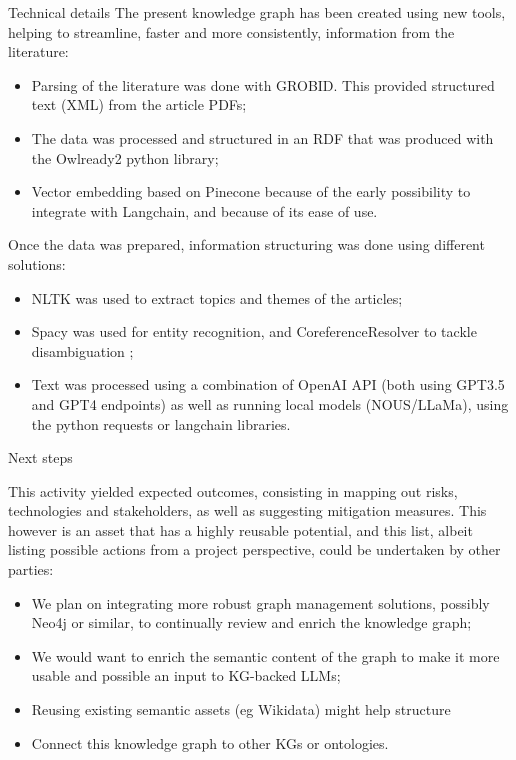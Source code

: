 \documentclass[final]{beamer}
\newlength{\onecolwid}
\begin{document}
\begin{columns}[t]
\begin{column}{\onecolwid}
         \begin{block}{Technical details}
          The present knowledge graph has been created using new tools, helping to streamline, faster and more consistently, information from the literature:
           \begin{itemize}
\item Parsing of the literature was done with GROBID. This provided structured text (XML) from the article PDFs;
\item The data was processed and structured in an RDF that was produced with the Owlready2 python library;
\item Vector embedding based on Pinecone because of the early possibility to integrate with Langchain, and because of its ease of use.

 \end{itemize}
Once the data was prepared, information structuring was done using different solutions:
           \begin{itemize}
\item NLTK was used to extract topics and themes of the articles;
\item Spacy was used for entity recognition, and CoreferenceResolver to tackle disambiguation ;
\item Text was processed using a combination of OpenAI API (both using GPT3.5 and GPT4 endpoints) as well as running local models (NOUS/LLaMa), using the python requests or langchain libraries.
                     \end{itemize}

                               \end{block}
          
          
          \begin{block}{Next steps}
          
                     This activity yielded expected outcomes, consisting in mapping out risks, technologies and stakeholders, as well as suggesting mitigation measures. This however is an asset that has a highly reusable potential, and this list, albeit listing possible actions from a project perspective, could be undertaken by other parties:
                                \begin{itemize}
\item We plan on integrating more robust graph management solutions, possibly Neo4j or similar, to continually review and enrich the knowledge graph;
\item We would want to enrich the semantic content of the graph to make it more usable and possible an input to KG-backed LLMs;
\item Reusing existing semantic assets (eg Wikidata) might help structure
\item Connect this knowledge graph to other KGs or ontologies.
                     \end{itemize}
          \end{block}
          

\end{column}
\end{columns}
\end{document}
